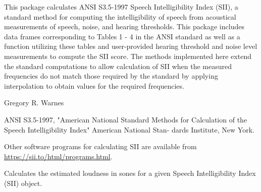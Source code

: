 \documentclass[letterpaper]{book}
\begin{document}
%
\begin{Description}
This package calculates ANSI S3.5-1997 Speech Intelligibility Index
(SII), a standard method for computing the intelligibility of
speech from acoustical measurements of speech, noise, and hearing
thresholds. This package includes data frames corresponding to
Tables 1 - 4 in the ANSI standard as well as a function utilizing
these tables and user-provided hearing threshold and noise level
measurements to compute the SII score.  The methods implemented
here extend the standard computations to allow calculation of SII
when the measured frequencies do not match those required by the
standard by applying interpolation to obtain values for the
required frequencies.
\end{Description}
%
\begin{Author}
Gregory R. Warnes 
\end{Author}
%
\begin{References}
ANSI S3.5-1997, "American National Standard Methods for 
Calculation of the Speech Intelligibility Index" American National Stan- 
dards Institute, New York.

Other software programs for calculating SII are available from
\url{https://sii.to/html/programs.html}.
\end{References}
%
\begin{Examples}
\end{Examples}
%
\begin{Description}
Calculates the estimated loudness in sones for a given Speech Intelligibility Index (SII) object.
\end{Description}
\end{document}
